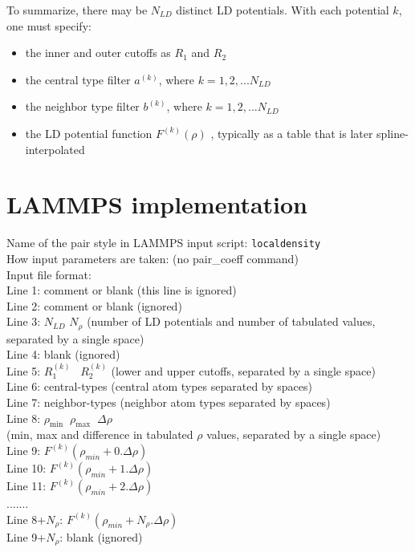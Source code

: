 \documentclass[10pt]{article}
\begin{document}
\noindent To summarize, there may be $N_{LD}$ distinct LD potentials.  With each potential $k$, one must specify:
%
\begin{itemize}
\item[] the inner and outer cutoffs as $R_1$ and $R_2$ 
\item[] the central type filter $a^{(k)}$, where $k = 1,2,...N_{LD}$
\item[] the neighbor type filter $b^{(k)}$, where $k = 1,2,...N_{LD}$
\item[] the LD potential function $F^{(k)}(\rho)$ , typically as a table that is later spline-interpolated
\end{itemize}
%
%
%
\section*{LAMMPS implementation}
Name of the pair style in LAMMPS input script: \texttt{localdensity}\\

\noindent How input parameters are taken:
 (no pair\_coeff command)\\

\noindent Input file format:\\
\noindent Line 1:   comment or blank (this line is ignored)\\
Line 2:   comment or blank (ignored)\\
Line 3:   $N_{LD}$ $N_{\rho}$ (number of LD potentials and number of tabulated values, separated by a single space)\\
Line 4:   blank (ignored)\\
Line 5:   $R_1^{(k)} \; \; \; R_2^{(k)}$ (lower and upper cutoffs, separated by a single space)\\
Line 6: 	central-types (central atom types separated by spaces)\\
Line 7: 	neighbor-types (neighbor atom types separated by spaces)\\
Line 8: 	$\rho_{\mathrm{min}} \; \; \rho_{\mathrm{max}} \; \; \Delta \rho$\\ (min, max and difference in tabulated $\rho$ values, separated by a single space)\\
Line 9: 	$F^{(k)}(\rho_{min} + 0.\Delta \rho)$\\
Line 10:	$F^{(k)}(\rho_{min} + 1.\Delta \rho)$\\
Line 11:	$F^{(k)}(\rho_{min} + 2.\Delta \rho)$\\
.......\\
Line 8+$N_\rho$:    $F^{(k)}(\rho_{min} + N_\rho . \Delta \rho)$\\	
Line 9+$N_\rho$:	  blank (ignored)\\
\end{document}
